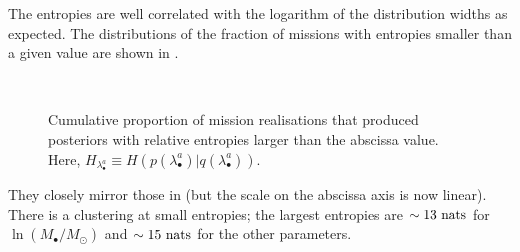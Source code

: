 The entropies are well correlated with the logarithm of the distribution widths as expected. The distributions of the fraction of missions with entropies smaller than a given value are shown in .
\begin{figure}%
\centering
    \quad 
    \\
    \quad
\caption{Cumulative proportion of mission realisations that produced posteriors with relative entropies larger than the abscissa value. Here, $H_{\lambda_\bullet^a} \equiv H(p(\lambda_\bullet^a)|q(\lambda_\bullet^a))$.}\label{fig:H-ent}
\end{figure}
They closely mirror those in  (but the scale on the abscissa axis is now linear). There is a clustering at small entropies; the largest entropies are $\sim 13~\mathrm{nats}$ for $\ln(M_\bullet/M_\odot)$ and $\sim 15~\mathrm{nats}$ for the other parameters.

